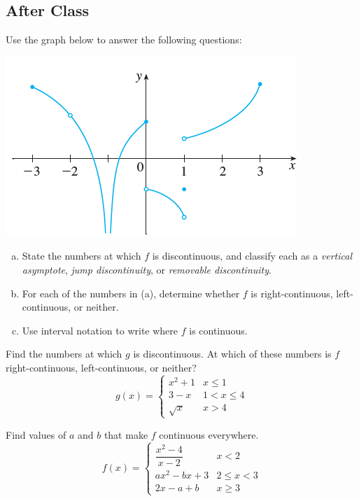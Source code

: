\documentclass[notes]{subfiles}
\begin{document}
	\subsection*{After Class}
		\begin{ex}
			Use the graph below to answer the following questions:\\
			\begin{minipage}{3in}
				\includegraphics[scale = .85]{1.8fig2}
			\end{minipage}
			\begin{minipage}{3.8in}
				\begin{enumerate}[(a)]
					\item State the numbers at which $f$ is discontinuous, and classify each as a \emph{vertical asymptote}, \emph{jump discontinuity}, or \emph{removable discontinuity}.
					\item For each of the numbers in (a), determine whether $f$ is right-continuous, left-continuous, or neither.  
					\item Use interval notation to write where $f$ is continuous.
				\end{enumerate}
			\end{minipage}
		\end{ex}
		\begin{ex}
			Find the numbers at which $g$ is discontinuous.  At which of these numbers is $f$ right-continuous, left-continuous, or neither?
				\[ g(x) = \begin{cases}x^2 + 1 & x \leq 1\\ 3-x & 1 < x \leq 4 \\ \sqrt{x} & x > 4 \end{cases}\]
		\end{ex}
			\newpage
			
		\begin{ex}
			Find values of $a$ and $b$ that make $f$ continuous everywhere.
				\[f(x) = \begin{cases}\dfrac{x^2-4}{x-2} & x < 2 \\ ax^2 - bx + 3 & 2\leq x < 3 \\ 2x - a + b & x \geq 3 \end{cases}\]
		\end{ex}
		
\end{document}
